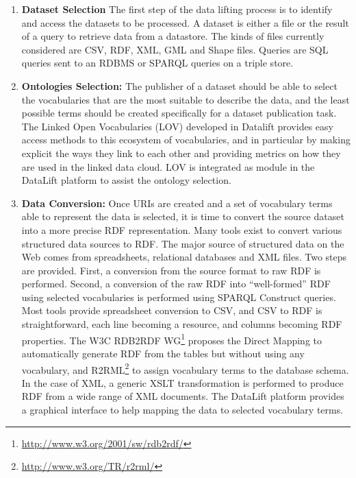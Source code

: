 \begin{enumerate}

\item{\textbf{Dataset Selection}}
The first step of the data lifting process is to identify and access the datasets to be processed. A dataset is either a file or the result of a query to retrieve data from a datastore. The kinds of files currently considered are CSV, RDF, XML, GML and Shape files. Queries are SQL queries sent to an RDBMS or SPARQL queries on a triple store.

\item {\textbf{Ontologies Selection:}}
The publisher of a dataset should be able to select the vocabularies that are the most suitable to describe the data, and the least possible terms should be created specifically for a dataset publication task. The Linked Open Vocabularies \cite{lov11} (LOV) developed in Datalift provides easy access methods to this ecosystem of vocabularies, and in particular by making explicit the ways they link to each other and providing metrics on how they are used in the linked data cloud. LOV is integrated as module in the DataLift platform to assist the ontology selection.

\item{\textbf{Data Conversion:}}
Once URIs are created and a set of vocabulary terms able to represent the data is selected, it is time to convert the source dataset into a more precise RDF representation. Many tools exist to convert various structured data sources to RDF. The major source of structured data on the Web comes from spreadsheets, relational databases and XML files. Two steps are provided. First, a conversion from the source format to raw RDF is performed. Second, a conversion of the raw RDF into ``well-formed'' RDF using selected vocabularies is performed using SPARQL Construct queries. Most tools provide spreadsheet conversion to CSV, and CSV to RDF is straightforward, each line becoming a resource, and columns becoming RDF properties. The W3C RDB2RDF WG\footnote{\url{http://www.w3.org/2001/sw/rdb2rdf/}} proposes the Direct Mapping to automatically generate RDF from the tables but without using any vocabulary, and R2RML\footnote{\url{http://www.w3.org/TR/r2rml/}}  to assign vocabulary terms to the database schema. In the case of XML, a generic XSLT transformation is performed to produce RDF from a wide range of XML documents. The DataLift platform provides a graphical interface to help mapping the data to selected vocabulary terms.


\end{enumerate}

